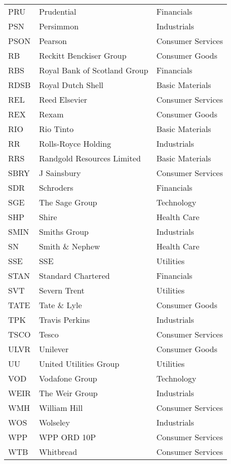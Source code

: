 \begin{center}
\begin{longtable}{|l|l|l|}
    PRU   & Prudential & Financials \\
    PSN   & Persimmon & Industrials \\
    PSON  & Pearson & Consumer Services \\
    RB    & Reckitt Benckiser Group & Consumer Goods \\
    RBS   & Royal Bank of Scotland Group & Financials \\
    RDSB  & Royal Dutch Shell & Basic Materials \\
    REL   & Reed Elsevier & Consumer Services \\
    REX   & Rexam & Consumer Goods \\
    RIO   & Rio Tinto & Basic Materials \\
    RR    & Rolls-Royce Holding & Industrials \\
    RRS   & Randgold Resources Limited & Basic Materials \\
    SBRY  & J Sainsbury & Consumer Services \\
    SDR   & Schroders & Financials \\
    SGE   & The Sage Group & Technology \\
    SHP   & Shire & Health Care \\
    SMIN  & Smiths Group & Industrials \\
    SN    & Smith \& Nephew & Health Care \\
    SSE   & SSE   & Utilities \\
    STAN  & Standard Chartered & Financials \\
    SVT   & Severn Trent & Utilities \\
    TATE  & Tate \& Lyle & Consumer Goods \\
    TPK   & Travis Perkins & Industrials \\
    TSCO  & Tesco & Consumer Services \\
    ULVR  & Unilever & Consumer Goods \\
    UU    & United Utilities Group & Utilities \\
    VOD   & Vodafone Group & Technology \\
    WEIR  & The Weir Group & Industrials \\
    WMH   & William Hill & Consumer Services \\
    WOS   & Wolseley & Industrials \\
    WPP   & WPP ORD 10P & Consumer Services \\
    WTB   & Whitbread & Consumer Services \\
\end{longtable}%
\end{center}



